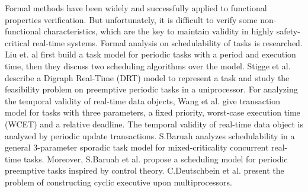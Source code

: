 \documentclass[10pt,conference]{IEEEtran}
\begin{document}
Formal methods have been widely and successfully applied to functional properties verification. But unfortunately, it is difficult to verify some non-functional characteristics, which are the key to maintain validity in highly safety-critical real-time systems. Formal analysis on schedulability of tasks is researched. Liu et. al \cite{DBLP:journals/jacm/LiuL73} first build a task model for periodic tasks with a period and execution time, then they discuss two scheduling algorithms over the model. Stigge et al. \cite{DBLP:conf/rtas/StiggeEGY11} describe a Digraph Real-Time (DRT) model to represent a task and study the feasibility problem on preemptive periodic tasks in a uniprocessor. For analyzing the temporal validity of real-time data objects, Wang et al. \cite{DBLP:journals/computing/WangLHSM13} give transaction model for tasks with three parameters, a fixed priority, worst-case execution time (WCET) and a relative deadline. The temporal validity of real-time data object is analyzed by periodic update transactions. S.Baruah \cite{DBLP:conf/rtss/Baruah16} analyzes schedulability in a general 3-parameter sporadic task model \cite{DBLP:journals/csur/BurnsD17} for mixed-criticality concurrent real-time tasks. Moreover, S.Baruah et al. \cite{DBLP:conf/rtns/BaruahBMV17} propose a scheduling model for periodic preemptive tasks inspired by control theory. 
C.Deutschbein et al. \cite{DBLP:conf/setta/DeutschbeinFBB17} present the problem of constructing cyclic executive upon multiprocessors.
\end{document}
